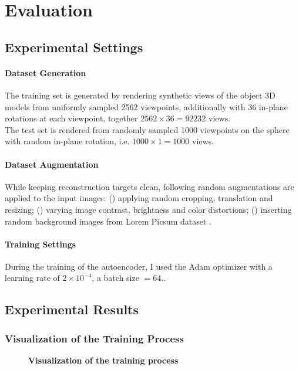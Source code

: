 \chapter{Evaluation}
\section{Experimental Settings}
\subsubsection{Dataset Generation}

The training set is generated by rendering synthetic views of the object 3D models from uniformly sampled 2562 viewpoints, additionally with 36 in-plane rotations at each viewpoint, together $2562 \times 36 = 92232$ views. 
\\[8pt]
The test set is rendered from randomly sampled 1000 viewpoints on the sphere with random in-plane rotation, i.e. $1000 \times 1 = 1000$ views.
\subsubsection{Dataset Augmentation}
While keeping reconstruction targets clean, following random augmentations are applied to the input images: 
() applying random cropping, translation and resizing; 
() varying image contrast, brightness and color distortions;
() inserting random background images from Lorem Picsum dataset \cite{Picsum}. 


\subsubsection{Training Settings}
During the training of the autoencoder, I used the Adam optimizer with a learning rate of $2 \times 10^{-4}$, a batch size $= 64$..

\newpage
\section{Experimental Results}
\subsection{Visualization of the Training Process}
\begin{figure}[H]
	\caption[Visualization of the training process]{\textbf{Visualization of the training process}}
	\label{fig:trainingprocess}
\end{figure}



